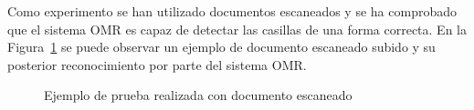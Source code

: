 \documentclass[a4paper, 12pt]{book}
\begin{document}
Como experimento se han utilizado documentos escaneados y se ha comprobado
que el sistema OMR es capaz de detectar las casillas de una forma
correcta. En la Figura~\ref{figura:test1} se puede observar un ejemplo
de documento escaneado subido y su posterior reconocimiento por parte
del sistema OMR.

\begin{figure}
  \centering
  \caption{Ejemplo de prueba realizada con documento escaneado}
  \label{figura:test1}
\end{figure}
\end{document}
